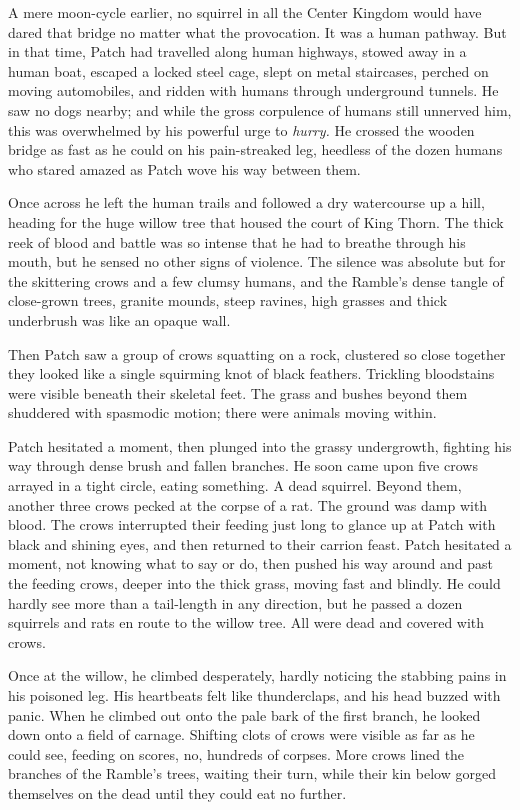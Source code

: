 \documentclass[ebook,oneside,openany,17pt]{memoir}
\begin{document}
A mere moon-cycle earlier, no squirrel in all the Center Kingdom would
have dared that bridge no matter what the provocation. It was a human
pathway. But in that time, Patch had travelled along human highways,
stowed away in a human boat, escaped a locked steel cage, slept on
metal staircases, perched on moving automobiles, and ridden with
humans through underground tunnels. He saw no dogs nearby; and while
the gross corpulence of humans still unnerved him, this was
overwhelmed by his powerful urge to \emph{hurry.} He crossed the
wooden bridge as fast as he could on his pain-streaked leg, heedless
of the dozen humans who stared amazed as Patch wove his way between
them.

Once across he left the human trails and followed a dry watercourse up
a hill, heading for the huge willow tree that housed the court of King
Thorn. The thick reek of blood and battle was so intense that he had
to breathe through his mouth, but he sensed no other signs of
violence. The silence was absolute but for the skittering crows and a
few clumsy humans, and the Ramble’s dense tangle of close-grown trees,
granite mounds, steep ravines, high grasses and thick underbrush was
like an opaque wall.

Then Patch saw a group of crows squatting on a rock, clustered so
close together they looked like a single squirming knot of black
feathers. Trickling bloodstains were visible beneath their skeletal
feet. The grass and bushes beyond them shuddered with spasmodic
motion; there were animals moving within.

Patch hesitated a moment, then plunged into the grassy undergrowth,
fighting his way through dense brush and fallen branches. He soon came
upon five crows arrayed in a tight circle, eating something. A dead
squirrel. Beyond them, another three crows pecked at the corpse of a
rat. The ground was damp with blood. The crows interrupted their
feeding just long to glance up at Patch with black and shining eyes,
and then returned to their carrion feast. Patch hesitated a moment,
not knowing what to say or do, then pushed his way around and past the
feeding crows, deeper into the thick grass, moving fast and
blindly. He could hardly see more than a tail-length in any direction,
but he passed a dozen squirrels and rats en route to the willow
tree. All were dead and covered with crows.

Once at the willow, he climbed desperately, hardly noticing the
stabbing pains in his poisoned leg. His heartbeats felt like
thunderclaps, and his head buzzed with panic. When he climbed out onto
the pale bark of the first branch, he looked down onto a field of
carnage. Shifting clots of crows were visible as far as he could see,
feeding on scores, no, hundreds of corpses. More crows lined the
branches of the Ramble’s trees, waiting their turn, while their kin
below gorged themselves on the dead until they could eat no further.
\end{document}
